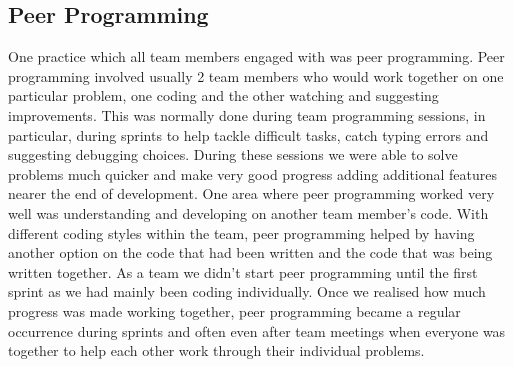 \documentclass{l3proj}
\begin{document}
\subsection{Peer Programming}
One practice which all team members engaged with was peer programming. Peer programming involved usually 2 team members who would work together on one particular problem, one coding and the other watching and suggesting improvements. This was normally done during team programming sessions, in particular, during sprints to help tackle difficult tasks, catch typing errors and suggesting debugging choices. During these sessions we were able to solve problems much quicker and make very good progress adding additional features nearer the end of development. One area where peer programming worked very well was understanding and developing on another team member’s code. With different coding styles within the team, peer programming helped by having another option on the code that had been written and the code that was being written together. 
As a team we didn’t start peer programming until the first sprint as we had mainly been coding individually. Once we realised how much progress was made working together, peer programming became a regular occurrence during sprints and often even after team meetings when everyone was together to help each other work through their individual problems.
\end{document}
